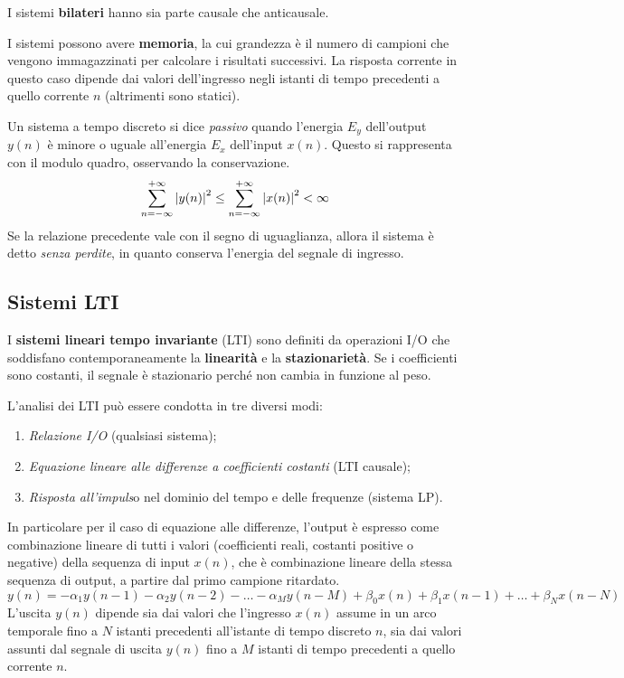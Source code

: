 I sistemi \textbf{bilateri} hanno sia parte causale che anticausale.

I sistemi possono avere \textbf{memoria}, la cui grandezza è il numero di campioni che vengono immagazzinati per calcolare i risultati successivi. La risposta corrente in questo caso dipende dai valori dell'ingresso negli istanti di tempo precedenti a quello corrente $n$ (altrimenti sono statici).

Un sistema a tempo discreto si dice \textit{passivo} quando l'energia $E_y$ dell'output $y(n)$ è minore o uguale all'energia $E_x$ dell'input $x(n)$. Questo si rappresenta con il modulo quadro, osservando la conservazione. 
$$\sum_{n=-\infty}^{+\infty}\left|y(n)\right|^2 \leq \sum_{n=-\infty}^{+\infty}\left|x(n)\right|^2 < \infty$$
Se la relazione precedente vale con il segno di uguaglianza, allora il sistema è detto \textit{senza perdite}, in quanto conserva l'energia del segnale di ingresso.

\subsection{Sistemi LTI}
I \textbf{sistemi lineari tempo invariante} (LTI) sono definiti da operazioni I/O che soddisfano contemporaneamente la \textbf{linearità} e la \textbf{stazionarietà}. Se i coefficienti sono costanti, il segnale è stazionario perché non cambia in funzione al peso.

L'analisi dei LTI può essere condotta in tre diversi modi:
\begin{enumerate}
	\item \textit{Relazione I/O} (qualsiasi sistema);
	\item \textit{Equazione lineare alle differenze a coefficienti costanti }(LTI causale);
	\item \textit{Risposta all'impuls}o nel dominio del tempo e delle frequenze (sistema LP).
\end{enumerate}

In particolare per il caso di equazione alle differenze, l'output è espresso come combinazione lineare di tutti i valori (coefficienti reali, costanti positive o negative) della sequenza di input $x(n)$, che è combinazione lineare della stessa sequenza di output, a partire dal primo campione ritardato. 
$$y(n) = -\alpha_1y(n-1) - \alpha_2y(n - 2) - \ldots - \alpha_My(n - M) + \beta_0x(n) + \beta_1x(n - 1) + \ldots + \beta_Nx(n - N)$$
L'uscita $y(n)$ dipende sia dai valori che l'ingresso $x(n)$ assume in un arco temporale fino a $N$ istanti precedenti all'istante di tempo discreto $n$, sia dai valori assunti dal segnale di uscita $y(n)$ fino a $M$ istanti di tempo precedenti a quello corrente $n$.

